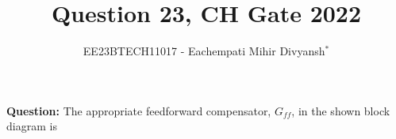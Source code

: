 \documentclass[journal,12pt,twocolumn]{IEEEtran}
\theoremstyle{remark}
\begin{document}

\vspace{3cm}

\title{Question 23, CH Gate 2022}
\author{EE23BTECH11017 - Eachempati Mihir Divyansh$^{*}$}
\maketitle
\newpage
\bigskip

\renewcommand{\thefigure}{\theenumi}
\renewcommand{\thetable}{\theenumi}
\textbf{Question:} 
The appropriate feedforward compensator, $G_{ff}$, in the shown block diagram is \\ \\


\end{document}
